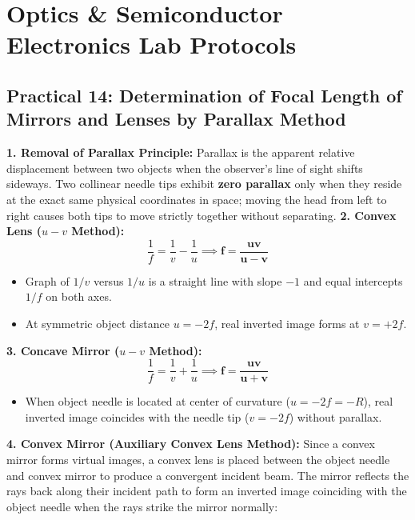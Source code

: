 \documentclass[10pt,twoside,openright]{book}
\begin{document}
\section{Optics \& Semiconductor Electronics Lab Protocols}

\subsection{Practical 14: Determination of Focal Length of Mirrors and Lenses by Parallax Method}

\begin{conceptbox}
\textbf{1. Removal of Parallax Principle:}
Parallax is the apparent relative displacement between two objects when the observer's line of sight shifts sideways. Two collinear needle tips exhibit \textbf{zero parallax} only when they reside at the exact same physical coordinates in space; moving the head from left to right causes both tips to move strictly together without separating.
\textbf{2. Convex Lens ($u-v$ Method):}
\begin{equation}
  \frac{1}{f} = \frac{1}{v} - \frac{1}{u} \implies \mathbf{f = \frac{u v}{u - v}}
\end{equation}
\begin{itemize}
  \item Graph of $1/v$ versus $1/u$ is a straight line with slope $-1$ and equal intercepts $1/f$ on both axes.
  \item At symmetric object distance $u = -2f$, real inverted image forms at $v = +2f$.
\end{itemize}
\textbf{3. Concave Mirror ($u-v$ Method):}
\begin{equation}
  \frac{1}{f} = \frac{1}{v} + \frac{1}{u} \implies \mathbf{f = \frac{u v}{u + v}}
\end{equation}
\begin{itemize}
  \item When object needle is located at center of curvature ($u = -2f = -R$), real inverted image coincides with the needle tip ($v = -2f$) without parallax.
\end{itemize}
\textbf{4. Convex Mirror (Auxiliary Convex Lens Method):}
Since a convex mirror forms virtual images, a convex lens is placed between the object needle and convex mirror to produce a convergent incident beam. The mirror reflects the rays back along their incident path to form an inverted image coinciding with the object needle when the rays strike the mirror normally:

\end{conceptbox}
\end{document}
